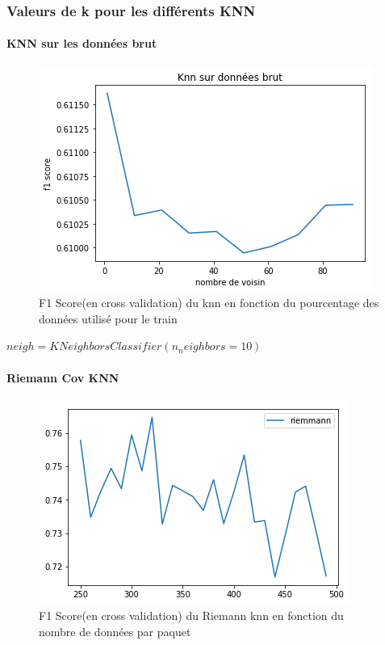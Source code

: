 \documentclass{article}
\begin{document}
\subsubsection{Valeurs de k pour les différents KNN}

\paragraph{KNN sur les données brut}
\begin{figure}[H]
\begin{center}
\includegraphics[scale=0.7]{images/f1_score_knn_brut.png}
\end{center}
\caption{F1 Score(en cross validation) du knn en fonction du pourcentage des données utilisé pour le train}
\end{figure}
$
neigh = KNeighborsClassifier(n_neighbors=10)
$


\paragraph{Riemann Cov KNN }
\begin{figure}[H]
\begin{center}
\includegraphics[scale=0.7]{images/riemann_cov_knn_f1Score.png}
\end{center}
\caption{F1 Score(en cross validation) du Riemann knn en fonction du nombre de données par paquet}
\end{figure}
\end{document}
